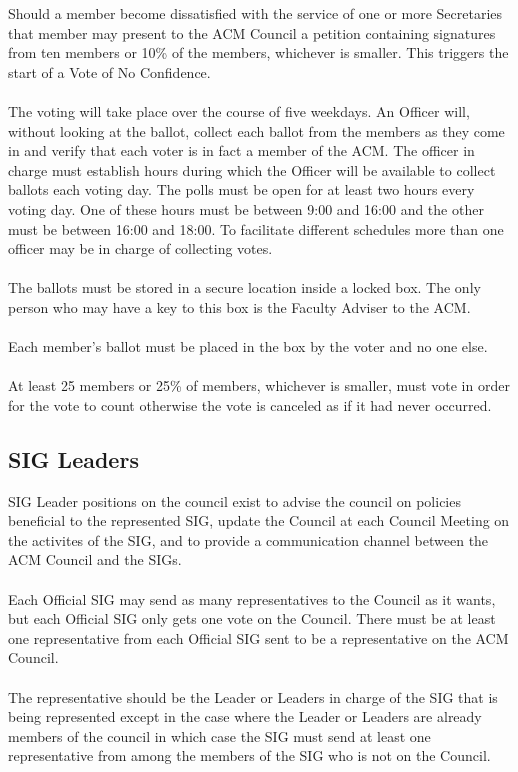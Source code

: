 \documentclass[12pt,titlepage]{article}
\begin{document}
Should a member become dissatisfied with the service of one or more Secretaries that member may present to the ACM Council a petition containing signatures from ten members or 10\% of the members, whichever is smaller. This triggers the start of a Vote of No Confidence.\\
\\
The voting will take place over the course of five weekdays. An Officer will, without looking at the ballot, collect each ballot from the members as they come in and verify that each voter is in fact a member of the ACM. The officer in charge must establish hours during which the Officer will be available to collect ballots each voting day. The polls must be open for at least two hours every voting day. One of these hours must be between 9:00 and 16:00 and the other must be between 16:00 and 18:00. To facilitate different schedules more than one officer may be in charge of collecting votes.\\
\\
The ballots must be stored in a secure location inside a locked box. The only person who may have a key to this box is the Faculty Adviser to the ACM.\\
\\
Each member's ballot must be placed in the box by the voter and no one else.\\
\\
At least 25 members or 25\% of members, whichever is smaller, must vote in order for the vote to count otherwise the vote is canceled as if it had never occurred.

\subsection{SIG Leaders}

SIG Leader positions on the council exist to advise the council on policies beneficial to the represented SIG, update the Council at each Council Meeting on the activites of the SIG, and to provide a communication channel between the ACM Council and the SIGs.\\
\\
Each Official SIG may send as many representatives to the Council as it wants, but each Official SIG only gets one vote on the Council. There must be at least one representative from each Official SIG sent to be a representative on the ACM Council.\\
\\
The representative should be the Leader or Leaders in charge of the SIG that is being represented except in the case where the Leader or Leaders are already members of the council in which case the SIG must send at least one representative from among the members of the SIG who is not on the Council.
\end{document}
